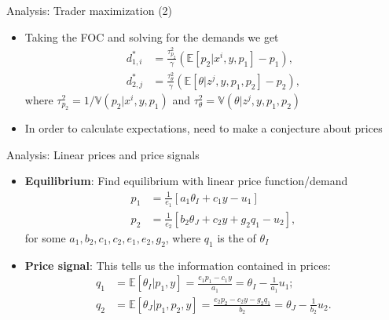 \documentclass[english,10pt
,aspectratio=169
]{beamer}
\begin{document}
\begin{frame}{Analysis: Trader maximization (2)}
	\begin{itemize}
		\item Taking the FOC and solving for the demands we get 
		\begin{align}
			d^*_{1,i} &= \frac{\tau^2_{p_2}}{\gamma}(\mathbb{E}[p_2| x^i, y, p_1]-p_1), \label{eqfoc1} \\
			d^*_{2,j} &= \frac{\tau^2_\theta}{\gamma} (\mathbb{E}[\theta| z^j, y, p_1, p_2]-p_2), \label{eqfoc2}
		\end{align}
		where $\tau^2_{p_2}=1/\mathbb{V}(p_2| x^i, y, p_1)$ and $\tau^2_{\theta}=\mathbb{V}(\theta| z^j, y, p_1, p_2)$
		\item In order to calculate expectations, need to make a conjecture about prices
	\end{itemize}
\end{frame}


\begin{frame}{Analysis: Linear prices and price signals}
	\begin{itemize}
		\item \textbf{Equilibrium}: Find equilibrium with linear price function/demand
		\begin{align}
			p_1 & = \frac{1}{e_1}\left[a_1 \theta_I + c_1 y - u_1 \right]\label{price1}\\
			p_2 & =\frac{1}{e_2}\left[ b_2 \theta_J + c_2 y +  g_2 q_1-u_2 \right], \label{price2}
		\end{align}
		for some $a_1,b_2,c_1,c_2,e_1,e_2,g_2$, 
		where $q_1$ is the  of $\theta_I$
		\item \textbf{Price signal}: This tells us the information contained in prices:
		\begin{align}
			q_1 & = \mathbb{E}[\theta_I|p_1,y]= \frac{e_1 p_1-c_1 y}{a_1} = \theta_I - \frac{1}{a_1} u_1 ; \label{signal1} \\
			q_2 &=\mathbb{E}[\theta_J|p_1,p_2,y]= \frac{e_2 p_2-c_2 y - g_2 q_1}{b_2} = \theta_J - \frac{1}{b_2} u_2. \label{signal2}
		\end{align}
	\end{itemize}
\end{frame}
\end{document}
